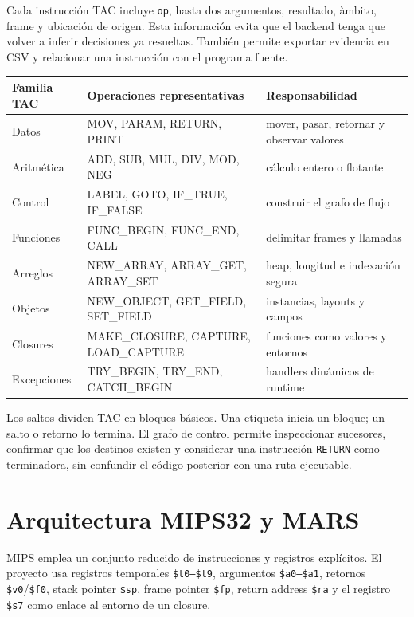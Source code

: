 \documentclass[11pt,letterpaper,oneside]{report}
\newcommand{\codigo}[1]{\texttt{#1}}
\begin{document}
Cada instrucci\'on TAC incluye \codigo{op}, hasta dos argumentos, resultado, \`ambito, frame y ubicaci\'on de origen. Esta informaci\'on evita que el backend tenga que volver a inferir decisiones ya resueltas. Tambi\'en permite exportar evidencia en CSV y relacionar una instrucci\'on con el programa fuente.

\begin{longtable}{p{3.5cm}p{4.4cm}p{5.3cm}}
\toprule
Familia TAC & Operaciones representativas & Responsabilidad\\\midrule
\endhead
Datos & MOV, PARAM, RETURN, PRINT & mover, pasar, retornar y observar valores\\
Aritm\'etica & ADD, SUB, MUL, DIV, MOD, NEG & c\'alculo entero o flotante\\
Control & LABEL, GOTO, IF\_TRUE, IF\_FALSE & construir el grafo de flujo\\
Funciones & FUNC\_BEGIN, FUNC\_END, CALL & delimitar frames y llamadas\\
Arreglos & NEW\_ARRAY, ARRAY\_GET, ARRAY\_SET & heap, longitud e indexaci\'on segura\\
Objetos & NEW\_OBJECT, GET\_FIELD, SET\_FIELD & instancias, layouts y campos\\
Closures & MAKE\_CLOSURE, CAPTURE, LOAD\_CAPTURE & funciones como valores y entornos\\
Excepciones & TRY\_BEGIN, TRY\_END, CATCH\_BEGIN & handlers din\'amicos de runtime\\
\bottomrule
\end{longtable}

Los saltos dividen TAC en bloques b\'asicos. Una etiqueta inicia un bloque; un salto o retorno lo termina. El grafo de control permite inspeccionar sucesores, confirmar que los destinos existen y considerar una instrucci\'on \codigo{RETURN} como terminadora, sin confundir el c\'odigo posterior con una ruta ejecutable.

\section{Arquitectura MIPS32 y MARS}

MIPS emplea un conjunto reducido de instrucciones y registros expl\'icitos. El proyecto usa registros temporales \codigo{\$t0--\$t9}, argumentos \codigo{\$a0--\$a1}, retornos \codigo{\$v0}/\codigo{\$f0}, stack pointer \codigo{\$sp}, frame pointer \codigo{\$fp}, return address \codigo{\$ra} y el registro \codigo{\$s7} como enlace al entorno de un closure.
\end{document}
